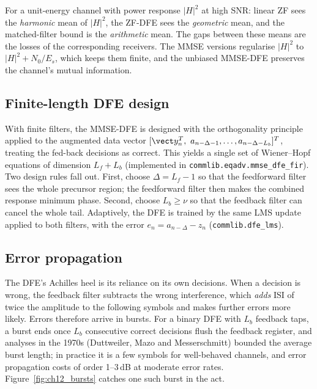 \begin{keyidea}
For a unit-energy channel with power response $|H|^2$ at high SNR:
linear ZF sees the \emph{harmonic} mean of $|H|^2$, the ZF-DFE sees the \emph{geometric} mean, and
the matched-filter bound is the \emph{arithmetic} mean. The gaps between these means are the losses
of the corresponding receivers. The MMSE versions regularise $|H|^2$ to $|H|^2+N_0/E_s$, which keeps
them finite, and the unbiased MMSE-DFE preserves the channel's mutual information.
\end{keyidea}

\subsection{Finite-length DFE design}

With finite filters, the MMSE-DFE is designed with the orthogonality principle applied to the
augmented data vector $[\vect y_n^T,\ a_{n-\Delta-1},\dots,a_{n-\Delta-L_b}]^T$, treating the fed-back
decisions as correct. This yields a single set of Wiener--Hopf equations of dimension $L_f+L_b$
(implemented in \texttt{commlib.eqadv.mmse\_dfe\_fir}). Two design rules fall out. First, choose
$\Delta=L_f-1$ so that the feedforward filter sees the whole precursor region; the feedforward
filter then makes the combined response minimum phase. Second, choose $L_b\ge\nu$ so that the
feedback filter can cancel the whole tail. Adaptively, the DFE is trained by the same LMS update
applied to both filters, with the error $e_n=\hat a_{n-\Delta}-z_n$
(\texttt{commlib.dfe\_lms}).

\subsection{Error propagation}


The DFE's Achilles heel is its reliance on its own decisions. When a decision is wrong, the
feedback filter subtracts the wrong interference, which \emph{adds} ISI of twice the amplitude to the
following symbols and makes further errors more likely. Errors therefore arrive in bursts. For a
binary DFE with $L_b$ feedback taps, a burst ends once $L_b$ consecutive correct decisions flush
the feedback register, and analyses in the 1970s (Duttweiler, Mazo and Messerschmitt) bounded the
average burst length; in practice it is a few symbols for well-behaved channels, and error
propagation costs of order 1--3\,dB at moderate error rates. Figure~\ref{fig:ch12_bursts} catches
one such burst in the act.

